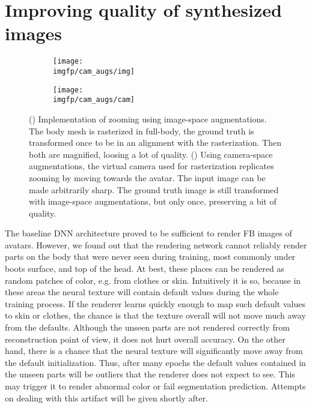 \section{Improving quality of synthesized images}\label{methods:zooms}
\begin{figure}
	\centering
	\begin{subfigure}[b]{0.48\textwidth}
		\centering
		\texttt{[image: \\imgfp/cam\_augs/img]}%
		\caption{}
		\label{fig:cam_aug:before}
	\end{subfigure}
	\begin{subfigure}[b]{0.48\textwidth}
		\centering
		\texttt{[image: \\imgfp/cam\_augs/cam]}%
		\caption{}
		\label{fig:cam_aug:after}
	\end{subfigure}
	\caption{(\protect{}) Implementation of zooming using image-space augmentations. The body mesh is rasterized in full-body, the ground truth is transformed once to be in an alignment with the rasterization. Then both are magnified, loosing a lot of quality. (\protect{}) Using camera-space augmentations, the virtual camera used for rasterization replicates zooming by moving towards the avatar. The input image can be made arbitrarily sharp. The ground truth image is still transformed with image-space augmentations, but only once, preserving a bit of quality. }
	\label{fig:cam_aug}
\end{figure}

The baseline DNN architecture \cite{dnn:stylepeople21} proved to be sufficient to render FB images of avatars. However, we found out that the rendering network cannot reliably render parts on the body that were never seen during training, most commonly under boots surface, and top of the head. At best, these places can be rendered as random patches of color, e.g. from clothes or skin. Intuitively it is so, because in these areas the neural texture will contain default values during the whole training process. If the renderer learns quickly enough to map such default values to skin or clothes, the chance is that the texture overall will not move much away from the defaults. Although the unseen parts are not rendered correctly from reconstruction point of view, it does not hurt overall accuracy. On the other hand, there is a chance that the neural texture will significantly move away from the default initialization. Thus, after many epochs the default values contained in the unseen parts will be outliers that the renderer does not expect to see. This may trigger it to render abnormal color or fail segmentation prediction. Attempts on dealing with this artifact will be given shortly after.

